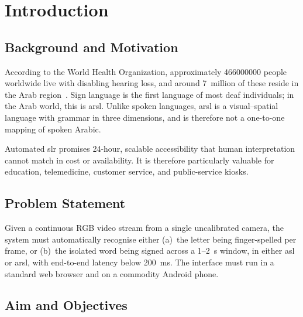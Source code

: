 \chapter{Introduction}
\label{ch:introduction}

\section{Background and Motivation}
\label{sec:intro:background}

According to the World Health Organization, approximately \num{466000000}
people worldwide live with disabling hearing loss, and around 7~million of
these reside in the Arab region~\cite{who2024hearing}. Sign language is the
first language of most deaf individuals; in the Arab world, this is
\gls{arsl}. Unlike spoken languages, \gls{arsl} is a visual--spatial
language with grammar in three dimensions, and is therefore not a
one-to-one mapping of spoken Arabic.


Automated \gls{slr} promises \num{24}-hour, scalable accessibility that
human interpretation cannot match in cost or availability. It is therefore
particularly valuable for education, telemedicine, customer service, and
public-service kiosks.

\section{Problem Statement}
\label{sec:intro:problem}

Given a continuous RGB video stream from a single uncalibrated camera, the
system must automatically recognise either (a)~the letter being
finger-spelled per frame, or (b)~the isolated word being signed across a
1--\SI{2}{\second} window, in either \gls{asl} or \gls{arsl}, with
end-to-end latency below \SI{200}{\milli\second}. The interface must run
in a standard web browser and on a commodity Android phone.

\section{Aim and Objectives}
\label{sec:intro:objectives}

